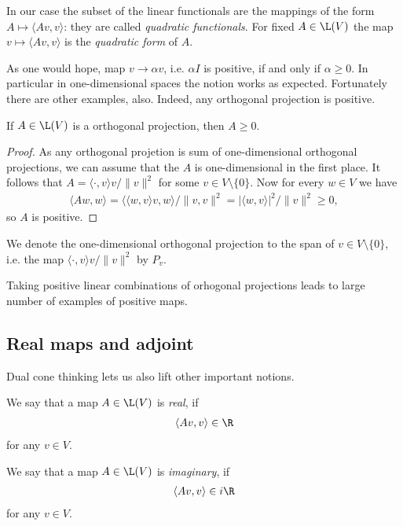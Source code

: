 In our case the subset of the linear functionals are the mappings of the form $A \mapsto \langle A v, v \rangle$: they are called \textit{quadratic functionals}. For fixed $A \in \L(V)$ the map $v \mapsto \langle A v, v \rangle$ is the \textit{quadratic form} of $A$.

As one would hope, map $v \to \alpha v$, i.e. $\alpha I$ is positive, if and only if $\alpha \geq 0$. In particular in one-dimensional spaces the notion works as expected. Fortunately there are other examples, also. Indeed, any orthogonal projection is positive.

\begin{prop}
	If $A \in \L(V)$ is a orthogonal projection, then $A \geq 0$.
\end{prop}
\begin{proof}
	As any orthogonal projetion is sum of one-dimensional orthogonal projections, we can assume that the $A$ is one-dimensional in the first place. It follows that $A = \langle \cdot, v \rangle v/\|v\|^2$ for some $v \in V \setminus \{0\}$. Now for every $w \in V$ we have
	\begin{align*}
		\langle A w, w \rangle = \langle \langle w, v \rangle v, w \rangle/\|v, v\|^{2} = |\langle w, v \rangle|^{2}/\|v\|^{2} \geq 0,
	\end{align*}
	so $A$ is positive.
\end{proof}

We denote the one-dimensional orthogonal projection to the span of $v \in V \setminus \{0\}$, i.e. the map $ \langle \cdot, v \rangle v/\|v\|^2$ by $P_{v}$.

Taking positive linear combinations of orhogonal projections leads to large number of examples of positive maps.

\subsection{Real maps and adjoint}

Dual cone thinking lets us also lift other important notions.

\begin{maar}
	We say that a map $A \in \L(V)$ is \textit{real}, if
	\begin{align*}
		\langle A v, v \rangle \in \R
	\end{align*}
	for any $v \in V$.
\end{maar}

\begin{maar}
	We say that a map $A \in \L(V)$ is \textit{imaginary}, if
	\begin{align*}
		\langle A v, v \rangle \in i \R
	\end{align*}
	for any $v \in V$.
\end{maar}

